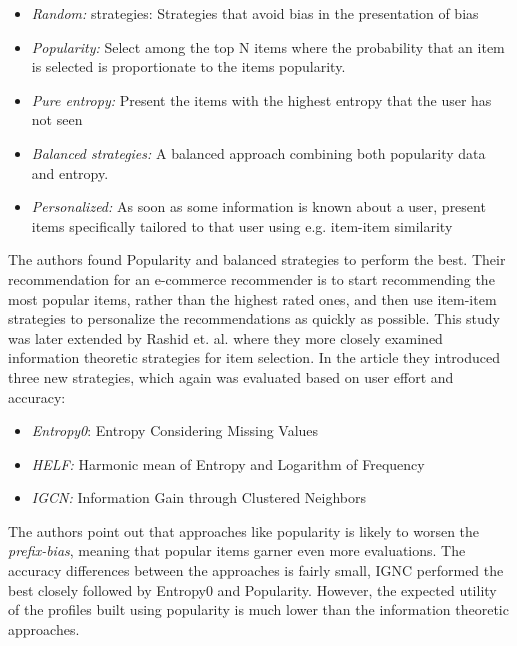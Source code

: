 \begin{itemize}
\item \emph{Random:} strategies: Strategies that avoid bias in the presentation
of bias
\item \emph{Popularity:} Select among the top N items where the probability
that an item is selected is proportionate to the items popularity.
\item \emph{Pure entropy:} Present the items with the highest entropy that the
user has not seen
\item \emph{Balanced strategies:} A balanced approach combining both popularity
data and entropy.
\item \emph{Personalized:} As soon as some information is known about a user,
present items specifically tailored to that user using e.g. item-item
similarity
\end{itemize}

The authors found Popularity and balanced strategies to perform the best. Their recommendation for an e-commerce recommender is to start recommending the most popular items, rather than the highest rated ones, and then use item-item strategies to personalize the recommendations as quickly as possible. This study was later extended by Rashid et. al. \cite{Rashid2008} where they
more closely examined information theoretic strategies for item selection. In the article they introduced three new strategies, which again was evaluated based on user effort and accuracy:

\begin{itemize}
\item \emph{Entropy0}: Entropy Considering Missing Values
\item \emph{HELF:} Harmonic mean of Entropy and Logarithm of Frequency
\item \emph{IGCN:} Information Gain through Clustered Neighbors
\end{itemize}

The authors point out that approaches like popularity is likely to worsen the \emph{prefix-bias}, meaning that popular items garner even more evaluations. The accuracy differences between the approaches is fairly small, IGNC performed the best closely followed by Entropy0 and Popularity. However, the expected utility of the profiles built using popularity is much lower than the information theoretic approaches.\linebreak[4]


